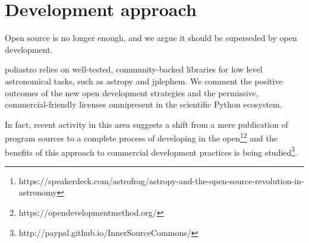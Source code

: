 \section{Development approach}
\label{sec:development}

Open source is no longer enough, and we argue it should be superseded by open development.

poliastro relies on well-tested, community-backed libraries for low level astronomical tasks, such as astropy\cite{Robitaille2013} and jplephem. We comment the positive outcomes of the new open development strategies and the permissive, commercial-friendly licenses omnipresent in the scientific Python ecosystem.

In fact, recent activity in this area suggests a shift from a mere publication of program sources to a complete process of developing in the open\footnote{https://speakerdeck.com/astrofrog/astropy-and-the-open-source-revolution-in-astronomy}\footnote{https://opendevelopmentmethod.org/} and the benefits of this approach to commercial development practices is being studied\footnote{http://paypal.github.io/InnerSourceCommons/}.
